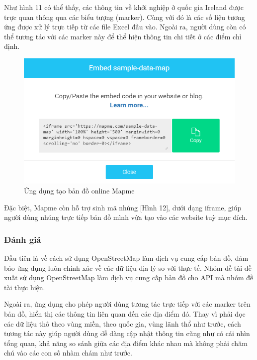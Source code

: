 \documentclass[12pt,a4paper]{article}
\begin{document}
Như hình 11 có thể thấy, các thông tin về khởi nghiệp ở quốc gia Ireland được trực quan thông qua các biểu tượng (marker). Cùng với đó là các số liệu tương ứng được xử lý trực tiếp từ các file Excel đầu vào.
Ngoài ra, người dùng còn có thể tương tác với các marker này để thể hiện thông tin chi tiết ở các điểm chỉ định.

\begin{figure}[htp]
	\begin{center}
    \includegraphics[scale=.8]{image/mapmeExport}
    \caption{Ứng dụng tạo bản đồ online Mapme}
    \label{refhinh12}
	\end{center}
\end{figure}

Đặc biệt, Mapme còn hỗ trợ sinh mã nhúng [Hình 12], dưới dạng iframe, giúp người dùng nhúng trực tiếp bản đồ mình vừa tạo vào các website tuỳ mục đích.

\subsubsection{Đánh giá}
Đầu tiên là về cách sử dụng OpenStreetMap làm dịch vụ cung cấp bản đồ, đảm bảo ứng dụng luôn chính xác về các dữ liệu địa lý so với thực tế. Nhóm đề tài đề xuất sử dụng OpenStreetMap làm dịch vụ cung cấp bản đồ cho API mà nhóm đề tài thực hiện.

Ngoài ra, ứng dụng cho phép người dùng tương tác trực tiếp với các marker trên bản đồ, hiển thị các thông tin liên quan đến các địa điểm đó. Thay vì phải đọc các dữ liệu thô theo vùng miền, theo quốc gia, vùng lãnh thổ như trước, cách tương tác này giúp người dùng dễ dàng cập nhật thông tin cũng như có cái nhìn tổng quan, khả năng so sánh giữa các địa điểm khác nhau mà không phải chăm chú vào các con số nhàm chám như trước.
\end{document}
